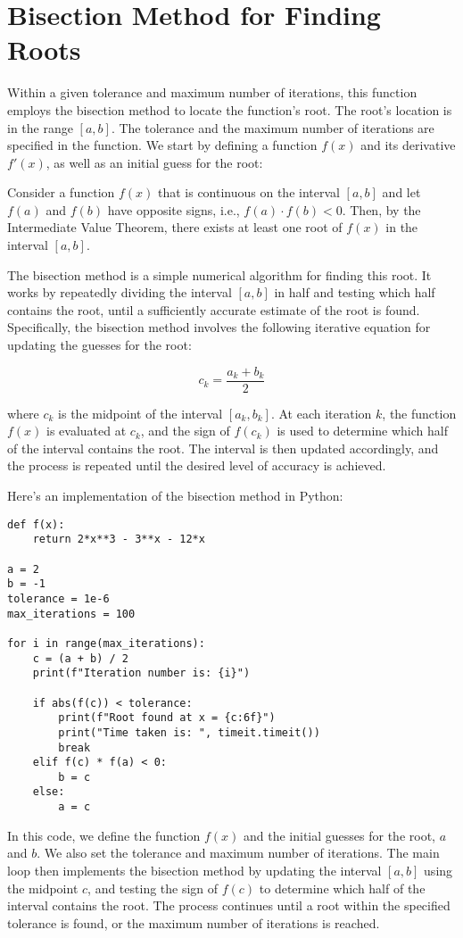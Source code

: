 \documentclass{article}
\begin{document}
\section*{Bisection Method for Finding Roots}

Within a given tolerance and maximum number of iterations, this function employs the bisection method to locate the function's root. The root's location is in the range $[a, b]$. The tolerance and the maximum number of iterations are specified in the function.
We start by defining a function $f(x)$ and its derivative $f'(x)$, as well as an initial guess for the root:


Consider a function $f(x)$ that is continuous on the interval $[a,b]$ and let $f(a)$ and $f(b)$ have opposite signs, i.e., $f(a) \cdot f(b) < 0$. Then, by the Intermediate Value Theorem, there exists at least one root of $f(x)$ in the interval $[a,b]$.

The bisection method is a simple numerical algorithm for finding this root. It works by repeatedly dividing the interval $[a,b]$ in half and testing which half contains the root, until a sufficiently accurate estimate of the root is found. Specifically, the bisection method involves the following iterative equation for updating the guesses for the root:

\begin{equation*}
    c_k = \frac{a_k + b_k}{2}
\end{equation*}

where $c_k$ is the midpoint of the interval $[a_k, b_k]$. At each iteration $k$, the function $f(x)$ is evaluated at $c_k$, and the sign of $f(c_k)$ is used to determine which half of the interval contains the root. The interval is then updated accordingly, and the process is repeated until the desired level of accuracy is achieved.

Here's an implementation of the bisection method in Python:

\begin{verbatim}
def f(x):
    return 2*x**3 - 3**x - 12*x

a = 2
b = -1
tolerance = 1e-6
max_iterations = 100
    
for i in range(max_iterations):
    c = (a + b) / 2
    print(f"Iteration number is: {i}")
    
    if abs(f(c)) < tolerance:
        print(f"Root found at x = {c:6f}")
        print("Time taken is: ", timeit.timeit())
        break
    elif f(c) * f(a) < 0:
        b = c
    else:
        a = c
\end{verbatim}

In this code, we define the function $f(x)$ and the initial guesses for the root, $a$ and $b$. We also set the tolerance and maximum number of iterations. The main loop then implements the bisection method by updating the interval $[a,b]$ using the midpoint $c$, and testing the sign of $f(c)$ to determine which half of the interval contains the root. The process continues until a root within the specified tolerance is found, or the maximum number of iterations is reached.
\end{document}
